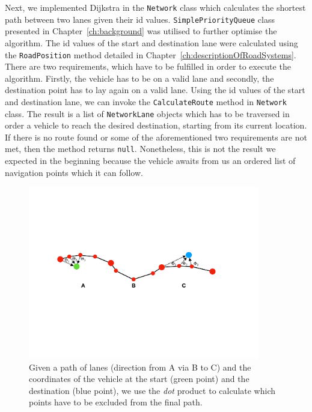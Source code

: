 Next, we implemented Dijkstra in the \texttt{Network} class which calculates the shortest path between two lanes given their id values. \texttt{SimplePriorityQueue} class presented in Chapter~\ref{ch:background} was utilised to further optimise the algorithm. The id values of the start and destination lane were calculated using the \texttt{RoadPosition} method detailed in Chapter~\ref{ch:descriptionOfRoadSystems}. There are two requirements, which have to be fulfilled in order to execute the algorithm. Firstly, the vehicle has to be on a valid lane and secondly, the destination point has to lay again on a valid lane. Using the id values of the start and destination lane, we can invoke the \texttt{CalculateRoute} method in \texttt{Network} class. The result is a list of \texttt{NetworkLane} objects which has to be traversed in order a vehicle to reach the desired destination, starting from its current location. If there is no route found or some of the aforementioned two requirements are not met, then the method returns \texttt{null}. Nonetheless, this is not the result we expected in the beginning because the vehicle awaits from us an ordered list of navigation points which it can follow.\\

\begin{figure}[htb]
	\centering
	\includegraphics[width=0.9\textwidth]{figures/navpoints}
	\caption{Given a path of lanes (direction from A via B to C) and the coordinates of the vehicle at the start (green point) and the destination (blue point), we use the \emph{dot} product to calculate which points have to be excluded from the final path.}
	\label{fig:navpoints}
\end{figure}

